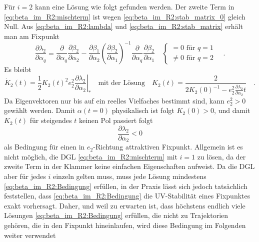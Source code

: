    Für $i=2$ kann eine Lösung wie folgt gefunden werden. Der zweite Term in 
    \eqref{eq:beta_im_R2:mischterm} ist wegen 
    \eqref{eq:beta_im_R2:stab_matrix_0} gleich Null.
    Aus \eqref{eq:beta_im_R2:lambda} und \eqref{eq:beta_im_R2:stab_matrix} 
    erhält man am Fixpunkt
    \begin{equation}
     \frac{\partial \lambda_2}{\partial \alpha_q} = 
     \frac{\partial}{\partial \alpha_q} 
     \frac{\partial \beta_2}{\partial \alpha_2} -
     \frac{\partial \beta_1}{\partial \alpha_2} 
     \left(\frac{\partial \beta_2}{\partial \alpha_1} \right)^{-1}
     \frac{\partial}{\partial \alpha_q} 
     \frac{\partial \beta_2}{\partial \alpha_1} \quad 
         \begin{cases}
     =0 \text{ für }q=1\\
     \neq 0 \text{ für }q=2 
   \end{cases}
   \quad .
    \end{equation}
    Es bleibt 
    \begin{equation}
     \dot{K}_2(t) =\frac12 K_2(t)^2  e_2^2 
     \left. \frac{\partial \lambda_2}{\partial \alpha_2} \right|_* \quad 
   \text{mit der Lösung} \quad 
     K_2(t) = \frac{2}{2 K_2(0)^{-1} - 
     e_2^2 \frac{\partial \lambda_2}{\partial \alpha_2}t } \quad .
    \end{equation}
    Da Eigenvektoren nur bis auf ein reelles Vielfaches bestimmt sind, kann 
    $e_2^2>0$ gewählt werden. Damit $\alpha(t=0)$ physikalisch ist folgt 
    $K_2(0)>0$, und damit $K_2(t)$ für steigendes $t$ keinen Pol passiert folgt 
    \begin{equation}
     \frac{\partial \lambda_2}{\partial \alpha_2} < 0
     \label{eq:beta_im_R2:Bedingung}
    \end{equation}
    als Bedingung für einen in $e_2$-Richtung attraktiven Fixpunkt.
    Allgemein ist es nicht möglich, die DGL \eqref{eq:beta_im_R2:mischterm} 
    mit $i=1$ zu lösen, da der zweite Term in der Klammer keine einfachen Eigenschaften 
    aufweist. Da die DGL aber für jedes $i$ einzeln gelten muss, muss jede 
    Lösung mindestens \eqref{eq:beta_im_R2:Bedingung} erfüllen, in der Praxis 
    lässt sich jedoch tatsächlich feststellen, dass 
    \eqref{eq:beta_im_R2:Bedingung} die UV-Stabilität eines Fixpunktes exakt 
    vorhersagt. Daher, und weil zu erwarten ist, dass höchstens endlich viele 
    Lösungen \eqref{eq:beta_im_R2:Bedingung} erfüllen, die nicht zu 
    Trajektorien gehören, die in den Fixpunkt hineinlaufen, 
    wird diese Bedingung im Folgenden weiter verwendet

 